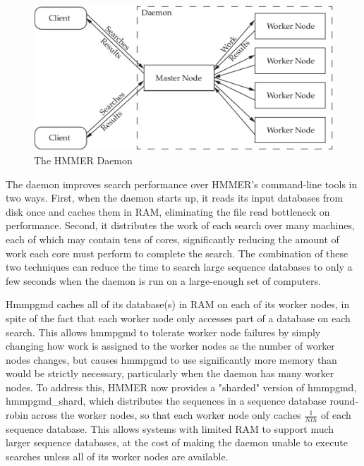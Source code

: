 \documentclass[notoc,justified]{tufte-book}    %
\begin{document}
\begin{figure}
\includegraphics[width=\textwidth]{inclusions/daemon.pdf}
\caption{The HMMER Daemon}
\label{fig:daemon}
\end{figure}

The daemon improves search performance over HMMER's command-line tools in two ways.  First, when the daemon starts up, it reads its input databases from disk once and caches them in RAM, eliminating the file read bottleneck on performance.  Second, it distributes the work of each search over many machines, each of which may contain tens of cores, significantly reducing the amount of work each core must perform to complete the search.  The combination of these two techniques can reduce the time to search large sequence databases to only a few seconds when the daemon is run on a large-enough set of computers.  

Hmmpgmd caches all of its database(s) in RAM on each of its worker nodes, in spite of the fact that each worker node only accesses part of a database on each search.  This allows hmmpgmd to tolerate worker node failures by simply changing how work is assigned to the worker nodes as the number of worker nodes changes, but causes hmmpgmd to use significantly more memory than would be strictly necessary, particularly when the daemon has many worker nodes.  To address this, HMMER now provides a "sharded" version of hmmpgmd, hmmpgmd\_shard, which distributes the sequences in a sequence database round-robin across the worker nodes, so that each worker node only caches $\frac{1}{Nth}$ of each sequence database.  This allows systems with limited RAM to support much larger sequence databases, at the cost of making the daemon unable to execute searches unless all of its worker nodes are available.
\end{document}
